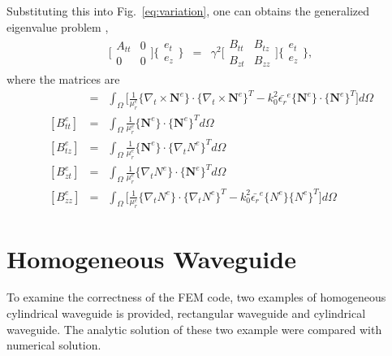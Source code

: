 \documentclass{pj}
\begin{document}
Substituting this into Fig.~\ref{eq:variation}, one can obtains the generalized eigenvalue problem \cite{na_JinJM_JinJM_2014_finite_element},
\begin{eqnarray}
\bigg[ \begin{matrix} A_{tt}&0\\ 0&0 \end{matrix} \bigg] \bigg\{ \begin{matrix} e_t\\ e_z \end{matrix} \bigg\} &=& \gamma^2 \bigg[ \begin{matrix} B_{tt}&B_{tz}\\ B_{zt}&B_{zz} \end{matrix} \bigg] \bigg\{ \begin{matrix} e_t\\ e_z \end{matrix} \bigg\},
\end{eqnarray}
where the matrices are
\begin{eqnarray}
[A_{tt}^e] &=& \int_\Omega \bigg[ \frac{1}{\mu_r^e} \{ \nabla_t \times \mathbf{N}^e \}
\cdot \{ \nabla_t \times \mathbf{N}^e \}^T - k_0^2 \bar{\epsilon_r}^e \{\mathbf{N}^e\} \cdot \{\mathbf{N}^e\}^T \bigg]d\Omega \\
\left[ B_{tt}^e \right] &=& \int_\Omega \frac{1}{\mu_r^e} \{\mathbf{N}^e\} \cdot \{\mathbf{N}^e\}^T d\Omega \\
\left[ B_{tz}^e \right] &=& \int_\Omega \frac{1}{\mu_r^e} \{\mathbf{N}^e\} \cdot \{\nabla_t{N}^e\}^T d\Omega \\
\left[ B_{zt}^e \right] &=& \int_\Omega \frac{1}{\mu_r^e} \{\nabla_t {N}^e\} \cdot \{\mathbf{N}^e\}^T d\Omega \\
\left[ B_{zz}^e \right] &=& \int_\Omega \bigg[ \frac{1}{\mu_r^e} \{ \nabla_t N^e \}
\cdot \{ \nabla_t N^e \}^T - k_0^2 \bar{\epsilon_r}^e \{ N^e \}\{ N^e\}^T \bigg]d\Omega
\label{elemat}
\end{eqnarray}

\section{Homogeneous Waveguide}
\label{sec:homo_wg}
To examine the correctness of the FEM code, two examples of homogeneous cylindrical waveguide is provided, rectangular waveguide and cylindrical waveguide. The analytic solution of these two example were compared with numerical solution. 
\end{document}
